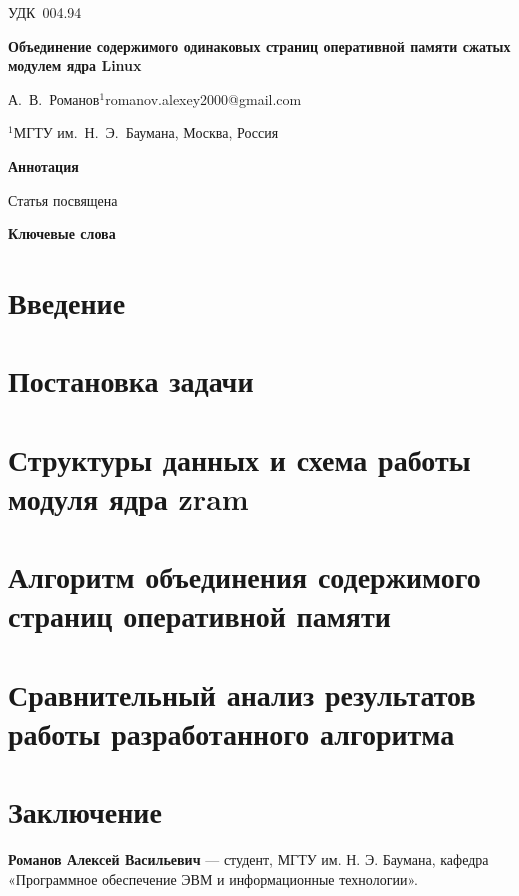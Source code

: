 \documentclass[12pt, a4paper]{article}
\begin{document}
\noindent УДК~004.94

\hfill

\noindent \textbf{Объединение содержимого одинаковых страниц оперативной памяти сжатых модулем ядра Linux}

\noindent А.~В.~Романов$^{1}$\hfill romanov.alexey2000@gmail.com

\noindent $^{1}$МГТУ им.~Н.~Э.~Баумана, Москва, Россия

\hfill

\noindent \textbf{Аннотация}

\noindent Статья посвящена 

\noindent \textbf{Ключевые слова}

\noindent \textit{}

\hfill

\section*{Введение}

\section{Постановка задачи}

\section{Структуры данных и схема работы модуля ядра zram}

\section{Алгоритм объединения содержимого страниц оперативной памяти}

\section{Сравнительный анализ результатов работы разработанного алгоритма}

\section*{Заключение}


\begin{thebibliography}{5}
\end{thebibliography}

\noindent \textbf{Романов Алексей Васильевич} — студент, МГТУ им. Н. Э. Баумана, кафедра «Программное обеспечение ЭВМ и информационные технологии».
\end{document}
